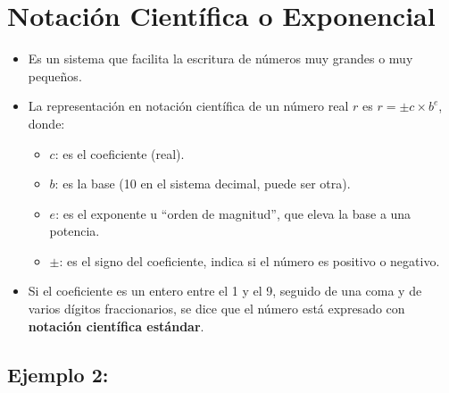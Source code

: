 \documentclass[]{book}
\providecommand{\tightlist}{%
  \setlength{\itemsep}{0pt}\setlength{\parskip}{0pt}}
\begin{document}
\hypertarget{notaciuxf3n-cientuxedfica-o-exponencial}{%
\section{Notación Científica o Exponencial}\label{notaciuxf3n-cientuxedfica-o-exponencial}}

\begin{itemize}
\item
  Es un sistema que facilita la escritura de números muy grandes o muy pequeños.
\item
  La representación en notación científica de un número real \(r\) es \(r = \pm c \times b^{e}\), donde:

  \begin{itemize}
  \tightlist
  \item
    \(c\): es el coeficiente (real).
  \item
    \(b\): es la base (10 en el sistema decimal, puede ser otra).
  \item
    \(e\): es el exponente u ``orden de magnitud'', que eleva la base a una potencia.
  \item
    \(\pm\): es el signo del coeficiente, indica si el número es positivo o negativo.
  \end{itemize}
\item
  Si el coeficiente es un entero entre el 1 y el 9, seguido de una coma y de varios dígitos fraccionarios, se dice que el número está expresado con \textbf{notación científica estándar}.
\end{itemize}

\hypertarget{ejemplo-2}{%
\subsection{Ejemplo 2:}\label{ejemplo-2}}
\end{document}
